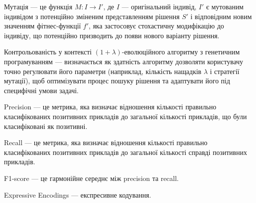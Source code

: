 Мутація --- це функція \( M: I \rightarrow I' \), де \( I \) — оригінальний індивід, \( I' \) є мутованим індивідом з потенційно зміненим представленням рішення \( S' \) і відповідним новим значенням фітнес-функції \( f' \), яка застосовує стохастичну модифікацію до індивіду, що потенційно призводить до появи нового варіанту рішення.

Контрольованість у контексті $(1+\lambda)$-еволюційного алгоритму з генетичним програмуванням --- визначається як здатність алгоритму дозволяти користувачу точно регулювати його параметри (наприклад, кількість нащадків $\lambda$ і стратегії мутації), щоб оптимізувати процес пошуку рішення та адаптувати його під специфічні умови задачі.

Precision --- це метрика, яка визначає відношення кількості правильно класифікованих позитивних прикладів до загальної кількості прикладів, що були класифіковані як позитивні.

Recall --- це метрика, яка визначає відношення кількості правильно класифікованих позитивних прикладів до загальної кількості справді позитивних прикладів.

F1-score --- це гармонійне середнє між precision та recall.

Expressive Encodings --- експресивне кодування.